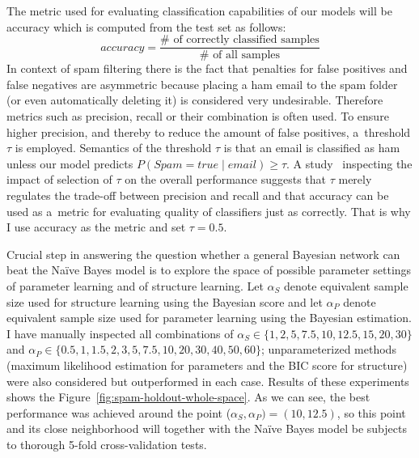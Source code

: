 \documentclass[english,cover]{fitthesis} %
\begin{document}
The metric used for evaluating  classification capabilities of our models will be accuracy which is computed from the test set as follows:
$$accuracy = \frac{\# \text{ of correctly classified samples}}{\# \text{ of all samples}}$$
In context of spam filtering there is the fact that penalties for false positives and false negatives are asymmetric because placing a ham email to the spam folder (or even automatically deleting it) is considered very undesirable. Therefore metrics such as precision, recall or their combination is often used. To ensure higher precision, and thereby to reduce the amount of false positives, a~threshold $\tau$ is employed. Semantics of the threshold $\tau$ is that an email is classified as ham unless our model predicts $P(Spam = true \mid email) \geq \tau$.
A study~\cite{androutsopoulos00_spam} inspecting the impact of selection of $\tau$ on the overall performance suggests that $\tau$ merely regulates the trade-off between precision and recall and that accuracy can be used as a~metric for evaluating quality of classifiers just as correctly. That is why I use accuracy as the metric and set $\tau = 0.5$.

\medskip
Crucial step in answering the question whether a general Bayesian network can beat the Naïve Bayes model is to explore the space of possible parameter settings of parameter learning and of structure learning. Let $\alpha_S$ denote equivalent sample size used for structure learning using the Bayesian score and let $\alpha_P$ denote equivalent sample size used for parameter learning using the Bayesian estimation. I have manually inspected all combinations of $\alpha_S \in \lbrace 1, 2, 5, 7.5, 10, 12.5, 15, 20, 30\rbrace$ and $\alpha_P \in \lbrace 0.5, 1, 1.5, 2, 3, 5, 7.5, 10, 20, 30, 40, 50, 60 \rbrace$; unparameterized methods (maximum likelihood estimation for parameters and the BIC score for structure) were also considered but outperformed in each case. Results of these experiments shows the Figure~\ref{fig:spam-holdout-whole-space}. As we can see, the best performance was achieved around the point ($\alpha_S, \alpha_P) = (10, 12.5)$, so this point and its close neighborhood will together with the Naïve Bayes model be subjects to thorough 5-fold cross-validation tests.
\end{document}
